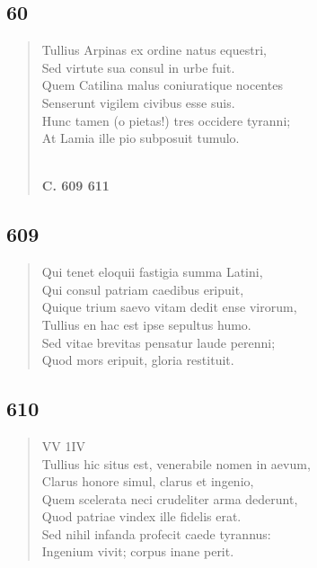 \documentclass[11pt, a4paper]{report}
\begin{document}
            \subsection*{60}
      \begin{verse}
      Tullius Arpinas ex ordine natus equestri, \\ Sed virtute sua consul in urbe fuit. \\ Quem Catilina malus coniuratique nocentes \\ Senserunt vigilem civibus esse suis. \\ Hunc tamen (o pietas!) tres occidere tyranni; \\ At Lamia ille pio subposuit tumulo. \\ 
        ﻿\pagebreak 
     \marginpar{[89]} \begin{center} \textbf{C. 609 611} \end{center}
      \end{verse}
  
            \subsection*{609}
      \begin{verse}
      Qui tenet eloquii fastigia summa Latini, \\ Qui consul patriam caedibus eripuit, \\ Quique trium saevo vitam dedit ense virorum, \\ Tullius en hac est ipse sepultus humo. \\ Sed vitae brevitas pensatur laude perenni; \\ Quod mors eripuit, gloria restituit. \\ 
      \end{verse}
  
            \subsection*{610}
      \begin{verse}
      VV 1IV \\ Tullius hic situs est, venerabile nomen in aevum, \\ Clarus honore simul, clarus et ingenio, \\ Quem scelerata neci crudeliter arma dederunt, \\ Quod patriae vindex ille fidelis erat. \\ Sed nihil infanda profecit caede tyrannus: \\ Ingenium vivit; corpus inane perit. \\ 
      \end{verse}
  
\end{document}
